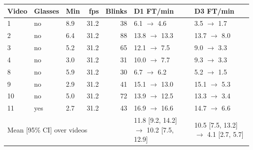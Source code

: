 \begin{tabular}{lllrrll}
\toprule
Video & Glasses & Min & fps & Blinks & D1 FT/min & D3 FT/min \\
\midrule
1 & no & 8.9 & 31.2 & 38 & 6.1 $\to$ 4.6 & 3.5 $\to$ 1.7 \\
2 & no & 6.4 & 31.2 & 88 & 13.8 $\to$ 13.3 & 13.7 $\to$ 8.0 \\
3 & no & 5.2 & 31.2 & 65 & 12.1 $\to$ 7.5 & 9.0 $\to$ 3.3 \\
4 & no & 3.0 & 31.2 & 31 & 10.0 $\to$ 7.7 & 9.3 $\to$ 3.3 \\
8 & no & 5.9 & 31.2 & 30 & 6.7 $\to$ 6.2 & 5.2 $\to$ 1.5 \\
9 & no & 2.9 & 31.2 & 41 & 15.1 $\to$ 13.0 & 15.1 $\to$ 5.3 \\
10 & no & 5.0 & 31.2 & 72 & 13.9 $\to$ 12.5 & 13.3 $\to$ 3.4 \\
11 & yes & 2.7 & 31.2 & 43 & 16.9 $\to$ 16.6 & 14.7 $\to$ 6.6 \\
\midrule
\multicolumn{5}{l}{Mean [95\% CI] over videos} & 11.8 [9.2, 14.2] $\to$ 10.2 [7.5, 12.9] & 10.5 [7.5, 13.2] $\to$ 4.1 [2.7, 5.7] \\
\bottomrule
\end{tabular}
